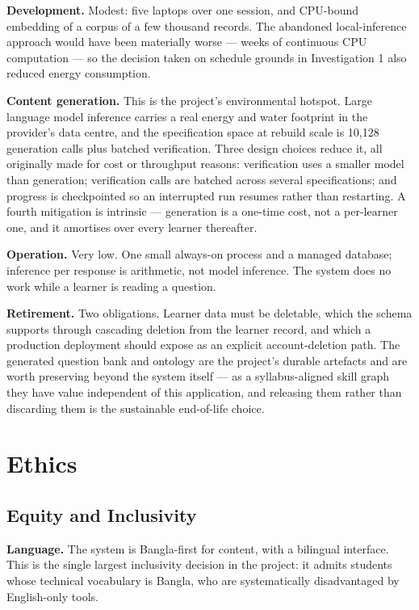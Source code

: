 \textbf{Development.} Modest: five laptops over one session, and CPU-bound
embedding of a corpus of a few thousand records. The abandoned local-inference
approach would have been materially worse --- weeks of continuous CPU
computation --- so the decision taken on schedule grounds in Investigation 1 also
reduced energy consumption.

\textbf{Content generation.} This is the project's environmental hotspot. Large
language model inference carries a real energy and water footprint in the
provider's data centre, and the specification space at rebuild scale is 10{,}128
generation calls plus batched verification. Three design choices reduce it, all
originally made for cost or throughput reasons: verification uses a smaller
model than generation; verification calls are batched across several
specifications; and progress is checkpointed so an interrupted run resumes
rather than restarting. A fourth mitigation is intrinsic --- generation is a
one-time cost, not a per-learner one, and it amortises over every learner
thereafter.

\textbf{Operation.} Very low. One small always-on process and a managed
database; inference per response is arithmetic, not model inference. The system
does no work while a learner is reading a question.

\textbf{Retirement.} Two obligations. Learner data must be deletable, which the
schema supports through cascading deletion from the learner record, and which a
production deployment should expose as an explicit account-deletion path. The
generated question bank and ontology are the project's durable artefacts and are
worth preserving beyond the system itself --- as a syllabus-aligned skill graph
they have value independent of this application, and releasing them rather than
discarding them is the sustainable end-of-life choice.

\section{Ethics}
\label{sec:ethics}

\subsection{Equity and Inclusivity}
\label{sec:equity}

\textbf{Language.} The system is Bangla-first for content, with a bilingual
interface. This is the single largest inclusivity decision in the project: it
admits students whose technical vocabulary is Bangla, who are systematically
disadvantaged by English-only tools.

